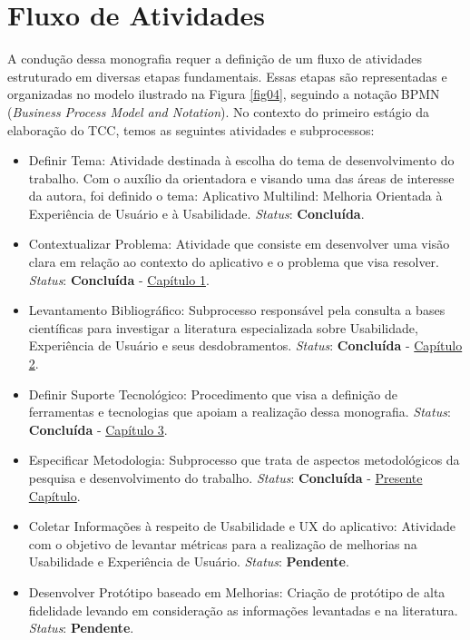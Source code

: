 \section{Fluxo de Atividades}
\label{sec:Fluxo de Atividades}
A condução dessa monografia requer a definição de um fluxo de atividades estruturado em diversas etapas fundamentais. Essas etapas são representadas e organizadas no modelo ilustrado na Figura \ref{fig04}, seguindo a notação BPMN (\textit{Business Process Model and Notation}). 
No contexto do primeiro estágio da elaboração do TCC, temos as seguintes atividades e subprocessos:

\begin{itemize}
	\item Definir Tema: Atividade destinada à escolha do tema de desenvolvimento do trabalho. Com o auxílio da orientadora e visando uma das áreas de interesse da autora, foi definido o tema: Aplicativo Multilind: Melhoria Orientada à
	Experiência de Usuário e à Usabilidade. \textit{Status}: \textbf{Concluída}.
	\item Contextualizar Problema: Atividade que consiste em desenvolver uma visão clara em relação ao contexto do aplicativo e o problema que visa resolver. \textit{Status}: \textbf{Concluída} - \hyperref[chap:Introducao]{Capítulo 1}.
	\item Levantamento Bibliográfico: Subprocesso responsável pela consulta a bases científicas para investigar a literatura especializada sobre Usabilidade, Experiência de Usuário e seus desdobramentos. \textit{Status}: \textbf{Concluída} - \hyperref[chap:Referencial]{Capítulo 2}.
	\item Definir Suporte Tecnológico: Procedimento que visa a definição de ferramentas e tecnologias que apoiam a realização dessa monografia. \textit{Status}: \textbf{Concluída} - \hyperref[chap:ReferencialTech]{Capítulo 3}.
	\item Especificar Metodologia: Subprocesso que trata de aspectos metodológicos da pesquisa e desenvolvimento do trabalho. \textit{Status}: \textbf{Concluída} - \hyperref[chap:Metodologia]{Presente Capítulo}.
	\item Coletar Informações à respeito de Usabilidade e UX do aplicativo: Atividade com o objetivo de levantar métricas para a realização de melhorias na Usabilidade e Experiência de Usuário. \textit{Status}: \textbf{Pendente}.
	\item Desenvolver Protótipo baseado em Melhorias: Criação de protótipo de alta fidelidade levando em consideração as informações levantadas e na literatura. \textit{Status}: \textbf{Pendente}.

\end{itemize}
